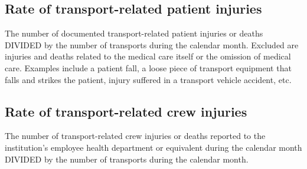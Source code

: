 \documentclass[twoside]{article}\usepackage[]{graphicx}\usepackage[]{color}
\makeatletter
\newenvironment{kframe}{%
 \def\at@end@of@kframe{}%
 \ifinner\ifhmode%
  \def\at@end@of@kframe{\end{minipage}}%
  \begin{minipage}{\columnwidth}%
 \fi\fi%
 \def\FrameCommand##1{\hskip\@totalleftmargin \hskip-\fboxsep
 \colorbox{shadecolor}{##1}\hskip-\fboxsep
     \hskip-\linewidth \hskip-\@totalleftmargin \hskip\columnwidth}%
 \MakeFramed {\advance\hsize-\width
   \@totalleftmargin\z@ \linewidth\hsize
   \@setminipage}}%
 {\par\unskip\endMakeFramed%
 \at@end@of@kframe}
\newenvironment{knitrout}{}{} %
\makeatother
\begin{document}
\begin{center}
\begin{knitrout}
\color{fgcolor}\begin{kframe}


{\ttfamily\noindent\bfseries\color{errorcolor}{\#\# Error: zero-length inputs cannot be mixed with those of non-zero length}}\end{kframe}
\end{knitrout}
\end{center}

\begin{kframe}


{\ttfamily\noindent\bfseries{}}\end{kframe}


\newpage
\subsection{Rate of transport-related patient injuries}
The number of documented transport-related patient injuries or deaths DIVIDED by the number of transports during the calendar month. Excluded are injuries and deaths related to the medical care itself or the omission of medical care. Examples include a patient fall, a loose piece of transport equipment that falls and strikes the patient, injury suffered in a transport vehicle accident, etc.

\begin{center}
\begin{knitrout}
\color{fgcolor}\begin{kframe}


{\ttfamily\noindent\bfseries\color{errorcolor}{\#\# Error: zero-length inputs cannot be mixed with those of non-zero length}}\end{kframe}
\end{knitrout}
\end{center}

\begin{kframe}


{\ttfamily\noindent\bfseries{}}\end{kframe}


\newpage
\subsection{Rate of transport-related crew injuries}
The number of transport-related crew injuries or deaths reported to the institution's employee health department or equivalent during the calendar month DIVIDED by the number of transports during the calendar month.
\end{document}
